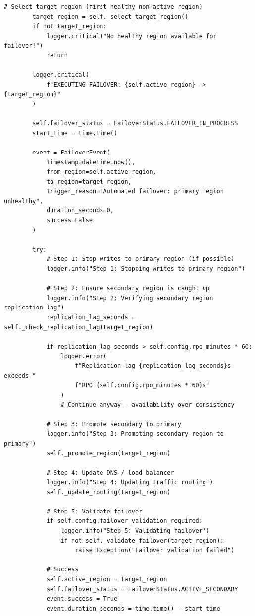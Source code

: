 \begin{lstlisting}[style=python, caption={Disaster Recovery Manager}]
        # Select target region (first healthy non-active region)
        target_region = self._select_target_region()
        if not target_region:
            logger.critical("No healthy region available for failover!")
            return

        logger.critical(
            f"EXECUTING FAILOVER: {self.active_region} -> {target_region}"
        )

        self.failover_status = FailoverStatus.FAILOVER_IN_PROGRESS
        start_time = time.time()

        event = FailoverEvent(
            timestamp=datetime.now(),
            from_region=self.active_region,
            to_region=target_region,
            trigger_reason="Automated failover: primary region unhealthy",
            duration_seconds=0,
            success=False
        )

        try:
            # Step 1: Stop writes to primary region (if possible)
            logger.info("Step 1: Stopping writes to primary region")

            # Step 2: Ensure secondary region is caught up
            logger.info("Step 2: Verifying secondary region replication lag")
            replication_lag_seconds = self._check_replication_lag(target_region)

            if replication_lag_seconds > self.config.rpo_minutes * 60:
                logger.error(
                    f"Replication lag {replication_lag_seconds}s exceeds "
                    f"RPO {self.config.rpo_minutes * 60}s"
                )
                # Continue anyway - availability over consistency

            # Step 3: Promote secondary to primary
            logger.info("Step 3: Promoting secondary region to primary")
            self._promote_region(target_region)

            # Step 4: Update DNS / load balancer
            logger.info("Step 4: Updating traffic routing")
            self._update_routing(target_region)

            # Step 5: Validate failover
            if self.config.failover_validation_required:
                logger.info("Step 5: Validating failover")
                if not self._validate_failover(target_region):
                    raise Exception("Failover validation failed")

            # Success
            self.active_region = target_region
            self.failover_status = FailoverStatus.ACTIVE_SECONDARY
            event.success = True
            event.duration_seconds = time.time() - start_time


\end{lstlisting}
